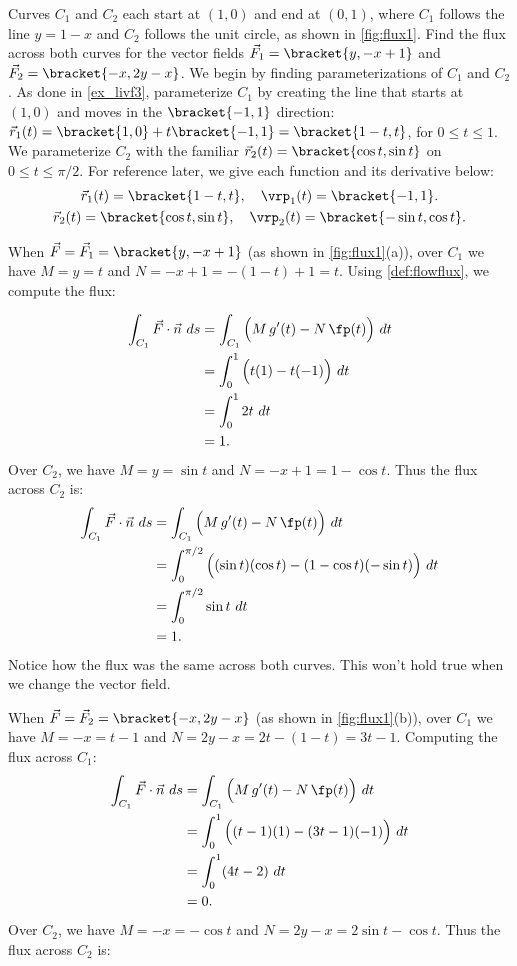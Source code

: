 \begin{example}\label{ex_flux1}
Curves $C_1$ and $C_2$ each start at $(1,0)$ and end at $(0,1)$, where $C_1$ follows the line $y=1-x$ and $C_2$ follows the unit circle, as shown in \autoref{fig:flux1}. Find the flux across both curves for the vector fields $\vec F_1 =\bracket{y,-x+1}$ and $\vec F_2 =\bracket{-x,2y-x}$.
\solution
We begin by finding parameterizations of $C_1$ and $C_2$. As done in \autoref{ex_livf3}, parameterize $C_1$ by creating the line that starts at $(1,0)$ and moves in the $\bracket{-1,1}$ direction: $\vec r_1(t) =\bracket{1,0}+t\bracket{-1,1}=\bracket{1-t,t}$, for $0\leq t\leq 1$. We parameterize $C_2$ with the familiar $\vec r_2(t) =\bracket{\cos t,\sin t}$ on $0\leq t\leq \pi/2$. For reference later, we give each function and its derivative below:
\begin{gather*}
\vec r_1(t) =\bracket{1-t,t},\quad\vrp_1(t)=\bracket{-1,1}.\\
\vec r_2(t) =\bracket{\cos t,\sin t}, \quad \vrp_2(t) =\bracket{-\sin t,\cos t}.
\end{gather*}

When $\vec F = \vec F_1 =\bracket{y,-x+1}$ (as shown in \autoref{fig:flux1}(a)), over $C_1$ we have $M = y =t$ and $N = -x+1 = -(1-t)+1 = t$. Using \autoref{def:flowflux}, we compute the flux:

\begin{align*}
\int_{C_1} \vec F\cdot \vec n\ ds & = \int_{C_1} \Big(M\,g'(t) - N\,\fp(t)\Big)\ dt\\
			&= \int_0^1 \Big( t(1) - t(-1)\Big)\ dt \\
			&= \int_0^1 2t\ dt\\
			&= 1.
\end{align*}
Over $C_2$, we have $M = y = \sin t$ and $N = -x+1 = 1-\cos t$. Thus the flux across $C_2$ is:
\begin{align*}
	\int_{C_1} \vec F\cdot \vec n\ ds
	& = \int_{C_1} \Big(M\,g'(t) - N\,\fp(t)\Big)\ dt\\
	&= \int_0^{\pi/2}\Big((\sin t)(\cos t) - (1-\cos t)(-\sin t)\Big)\ dt\\
	&= \int_0^{\pi/2} \sin t\ dt\\
	&=1.
\end{align*}
Notice how the flux was the same across both curves. This won't hold true when we change the vector field.

When $\vec F=\vec F_2=\bracket{-x,2y-x}$ (as shown in \autoref{fig:flux1}(b)), over $C_1$ we have $M=-x=t-1$ and $N=2y-x=2t-(1-t)=3t-1$. Computing the flux across $C_1$:
\begin{align*}
	\int_{C_1} \vec F\cdot \vec n\ ds
	& = \int_{C_1} \Big(M\,g'(t) - N\,\fp(t)\Big)\ dt\\
	&= \int_0^1 \Big( (t-1)(1) - (3t-1)(-1)\Big)\ dt \\
	&= \int_0^1 (4t-2)\ dt\\
	&= 0.
\end{align*}
Over $C_2$, we have $M = -x = -\cos t$ and $N = 2y-x = 2\sin t-\cos t$. Thus the flux across $C_2$ is:


\end{example}

